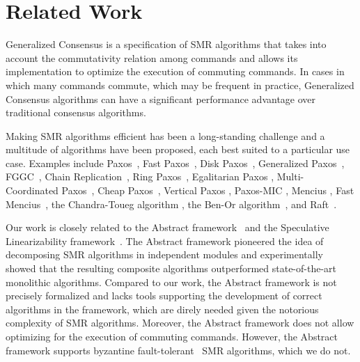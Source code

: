 \section{Related Work}
\label{sec:related}

Generalized Consensus is a specification of SMR algorithms that takes into account the commutativity relation among commands and allows its implementation to optimize the execution of commuting commands. In cases in which many commands commute, which may be frequent in practice, Generalized Consensus algorithms can have a significant performance advantage over traditional consensus algorithms.

Making SMR algorithms efficient has been a long-standing
challenge and a multitude of algorithms have been proposed, each best suited to a particular use case.
Examples include Paxos~\cite{lamport2001paxos}, Fast
Paxos~\cite{Lamport06FastPaxos}, Disk Paxos~\cite{GafniLamport03DiskPaxos},
Generalized Paxos~\cite{Lamport05GeneralizeConsensus},
FGGC~\cite{SutraShapiro11FastGenuineGeneralizedConsensus}, Chain
Replication~\cite{RenesseSchneider04ChainReplicationSupportingHighThroughputAvailability}, Ring
Paxos~\cite{MarandiETAL10RingPaxosHighthroughputAtomicBroadcastProtocol},
Egalitarian Paxos
\cite{MoraruAndersenKaminsky13ThereIsMoreConsensusEgalitarianParliaments},
Multi-Coordinated Paxos~\cite{CamargosSchmidtPedone07MulticoordinatedPaxos},
Cheap Paxos~\cite{LamportMassa04CheapPaxos}, Vertical Paxos
\cite{LamportMalkhiZhou09VerticalPaxosPrimarybackupReplication}, Paxos-MIC
\cite{HurfinMoiseNarzul11AdaptiveFastPaxosMakingQuickEverlasting}, Mencius
\cite{MaoJunqueiraMarzullo08MenciusBuildingEfficientReplicatedStateMachine},
Fast Mencius~\cite{WeiETAL13FastMenciusMenciusLowCommitLatency},
the Chandra-Toueg algorithm
\cite{ChandraToueg96UnreliableFailureDetectorsReliableDistributedSystems}, the
Ben-Or algorithm~\cite{BenOr83AnotherAdvantageFreeChoiceCompletelyAsynchronous},
and Raft~\cite{OngaroOusterhout14SearchUnderstandableConsensusAlgorithm}.


Our work is closely related to the Abstract
framework~\cite{GuerraouiETAL10Next700BftProtocols}
and the Speculative Linearizability
framework~\cite{GuerraouiKuncakLosa12SpeculativeLinearizability}. The
Abstract framework pioneered the idea of decomposing SMR algorithms in
independent modules and experimentally showed that the resulting composite
algorithms outperformed state-of-the-art monolithic algorithms. Compared
to our work, the Abstract framework is not precisely formalized and lacks
tools supporting the development of correct algorithms in the framework,
which are direly needed given the notorious complexity of SMR algorithms.
Moreover, the Abstract framework does not allow optimizing for the execution
of commuting commands. However, the Abstract framework supports byzantine
fault-tolerant~\cite{LamportShostakPease82ByzantineGeneralsProblem} SMR
algorithms, which we do not. 

